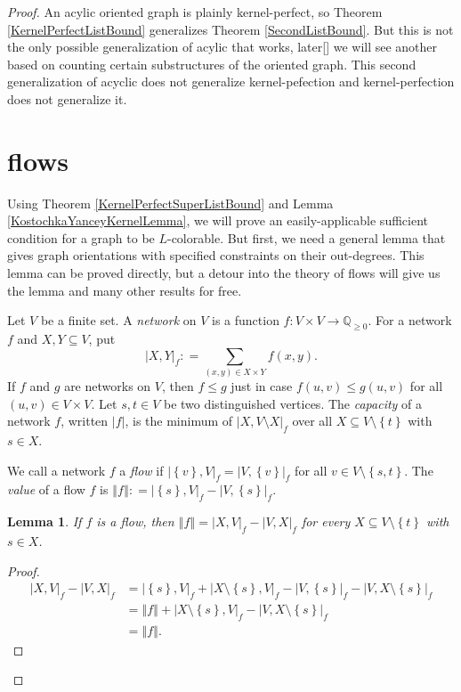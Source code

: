 \documentclass{amsbook}
\newcommand{\aaside}[2]{\marginnote{\scriptsize{#1}}[#2]}
\theoremstyle{plain}
\newtheorem{lemma}{Lemma}
\numberwithin{equation}{chapter}
\newcommand{\set}[1]{\left\{ #1 \right\}}
\newcommand{\card}[1]{\left|#1\right|}
\newcommand{\size}[1]{\left\Vert#1\right\Vert}
\newcommand{\func}[3]{#1\colon #2 \rightarrow #3}
\newcommand{\DefinedAs}{\mathrel{\mathop:}=}
\newcommand{\Q}{\mathbb{Q}}
\begin{document}
\begin{proof}
An acylic oriented graph is plainly kernel-perfect, so Theorem \ref{KernelPerfectListBound} generalizes Theorem \ref{SecondListBound}.  
But this is not the only possible generalization of acylic that works, later\aaside{\textcolor{blue}{what chapter?}}{} we will see another based on counting certain substructures of the oriented graph. 
This second generalization of acyclic does not generalize kernel-pefection and kernel-perfection does not generalize it.

\section*{flows}
Using Theorem \ref{KernelPerfectSuperListBound} and Lemma \ref{KostochkaYanceyKernelLemma}, we will prove an easily-applicable sufficient condition for a graph to be $L$-colorable.  
But first, we need a general lemma that gives graph orientations with specified constraints on their out-degrees.  This lemma can be proved directly, 
but a detour into the theory of flows will give us the lemma and many other results for free.

Let $V$ be a finite set.  A \emph{network} on $V$ is a function $\func{f}{V\times V}{\Q_{\ge 0}}$.  For a network $f$ and $X,Y \subseteq V$, put
\[\card{X,Y}_f \DefinedAs \sum_{(x,y) \in X\times Y} f(x,y).\]
If $f$ and $g$ are networks on $V$, then $f \le g$ just in case $f(u,v) \le g(u,v)$ for all $(u,v)\in V\times V$.
Let $s,t \in V$ be two distinguished vertices.  The \emph{capacity} of a network $f$, written $\card{f}$, is the minimum of $\card{X, V\setminus X}_f$ over all $X \subseteq V\setminus\set{t}$ with $s \in X$.

We call a network $f$ a \emph{flow} if $\card{\set{v},V}_f = \card{V,\set{v}}_f$ for all $v \in V \setminus \set{s,t}$.
The \emph{value} of a flow $f$ is $\size{f} \DefinedAs \card{\set{s},V}_f - \card{V,\set{s}}_f$.

\begin{lemma}\label{FlowValues}
If $f$ is a flow, then $\size{f} = \card{X, V}_f - \card{V, X}_f$ for every $X \subseteq V\setminus\set{t}$ with $s \in X$.
\end{lemma}
\begin{proof}
\begin{align*}
\card{X, V}_f - \card{V, X}_f &= \card{\set{s}, V}_f + \card{X\setminus\set{s}, V}_f - \card{V, \set{s}}_f - \card{V, X\setminus\set{s}}_f\\
&= \size{f} + \card{X\setminus\set{s}, V}_f - \card{V, X\setminus\set{s}}_f\\
&= \size{f}.
\end{align*}
\end{proof}


\end{proof}
\end{document}
